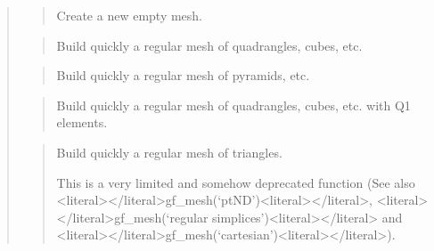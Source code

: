 \documentclass[a4paper,11pt,english]{sphinxmanual}
\begin{document}
\sphinxAtStartPar
{}
\begin{quote}

\sphinxAtStartPar
{}
\begin{quote}

\sphinxAtStartPar
Create a new empty mesh.
\end{quote}

\sphinxAtStartPar
{}
\begin{quote}

\sphinxAtStartPar
Build quickly a regular mesh of quadrangles, cubes, etc.
\end{quote}

\sphinxAtStartPar
{}
\begin{quote}

\sphinxAtStartPar
Build quickly a regular mesh of pyramids, etc.
\end{quote}

\sphinxAtStartPar
{}
\begin{quote}

\sphinxAtStartPar
Build quickly a regular mesh of quadrangles, cubes, etc. with
Q1 elements.
\end{quote}

\sphinxAtStartPar
{}
\begin{quote}

\sphinxAtStartPar
Build quickly a regular mesh of triangles.

\sphinxAtStartPar
This is a very limited and somehow deprecated function (See also
\textless{}literal\textgreater{}\textless{}/literal\textgreater{}gf\_mesh(‘ptND’)\textless{}literal\textgreater{}\textless{}/literal\textgreater{}, \textless{}literal\textgreater{}\textless{}/literal\textgreater{}gf\_mesh(‘regular simplices’)\textless{}literal\textgreater{}\textless{}/literal\textgreater{} and
\textless{}literal\textgreater{}\textless{}/literal\textgreater{}gf\_mesh(‘cartesian’)\textless{}literal\textgreater{}\textless{}/literal\textgreater{}).
\end{quote}


\end{quote}
\end{document}

